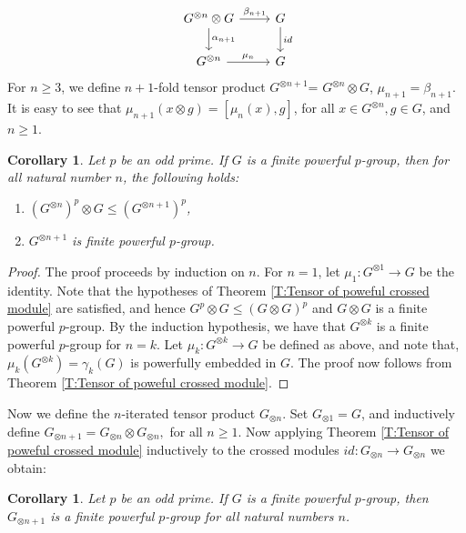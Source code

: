 \documentclass[12pt]{elsarticle}
\newtheorem{corollary}[theorem]{Corollary}
\newtheorem*{main corollary*}{Main Corollary}
\theoremstyle{definition}
\begin{document}
      \begin{equation}
\begin{tikzcd}
		G^{\otimes{n}}\otimes G \arrow[r,"\beta_{n+1}"] \arrow[d,"\alpha_{n+1}"] & G \arrow[d,"id"] \\
		G^{\otimes{n}} \arrow[r,"\mu_{n}"] & G
	\end{tikzcd}\label{tensorsquare2}
\end{equation}
For $n\geq 3$, we define $n+1$-fold tensor product $G^{\otimes {n+1}}$= $G^{\otimes{n}}\otimes G$, $\mu_{n+1}=\beta_{n+1}$. It is easy to see that $\mu_{n+1}(x \otimes g)=[\mu_{n}(x),g]$, for all $x \in G^{\otimes{n}}, g \in G$, and $n\geq 1.$

\begin{corollary}\label{nfold tensor is powerful}
    Let $p$ be an odd prime. If $G$ is a finite powerful $p$-group, then for all natural number $n$, the following holds:
    \begin{enumerate}
        \item[(i)] $(G^{\otimes {n}})^p\otimes G\leqslant (G^{\otimes n+1})^p$,
        \item[(ii)] $G^{\otimes {n+1}}$ is finite powerful $p$-group.
    \end{enumerate} 
\end{corollary}
\begin{proof}
      The proof proceeds by induction on $n$. For $n=1$, let $\mu_1:G^{\otimes 1}\to G$ be the identity. Note that the hypotheses of Theorem \ref{T:Tensor of poweful crossed module} are satisfied, and hence $G^p\otimes G\leqslant (G\otimes G)^p$ and $G\otimes G$ is a finite powerful $p$-group. By the induction hypothesis, we have that $G^{\otimes k}$ is a finite powerful $p$-group for $n=k$. Let $\mu_k:G^{\otimes k}\to G$ be defined as above, and note that, $\mu_k(G^{\otimes k})=\gamma_k(G)$ is powerfully embedded in $G$. The proof now follows from Theorem \ref{T:Tensor of poweful crossed module}.
\end{proof}
Now we define the $n$-iterated tensor product $G_{\otimes n}$. Set $G_{\otimes 1}=G$, and inductively define $G_{\otimes n+1}=G_{\otimes n}\otimes G_{\otimes n}, $ for all $n\geq 1.$ Now applying Theorem \ref{T:Tensor of poweful crossed module} inductively to the crossed modules $id:G_{\otimes {n}}\to G_{\otimes {n}}$ we obtain:
\begin{corollary}\label{n-iterated tensor product is powerful}
    Let $p$ be an odd prime. If $G$ is a finite powerful $p$-group, then $G_{\otimes {n+1}}$ is a finite powerful $p$-group for all natural numbers $n$. 
\end{corollary}
\end{document}
